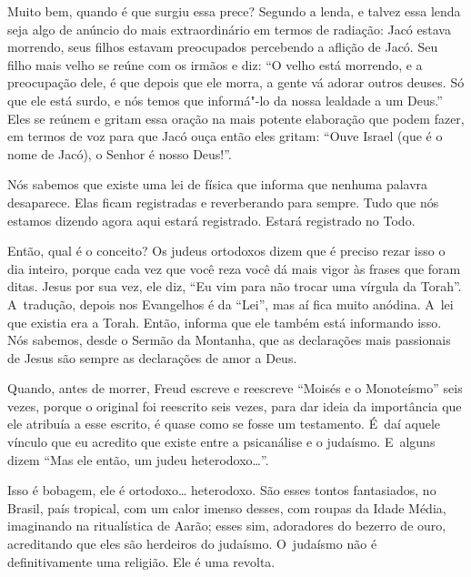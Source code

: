  

Muito bem, quando é que surgiu essa prece? Segundo a lenda, e talvez
essa lenda seja algo de anúncio do mais extraordinário em termos de
radiação: Jacó estava morrendo, seus filhos estavam preocupados
percebendo a aflição de Jacó. Seu filho mais velho se reúne com os
irmãos e diz: ``O velho está morrendo, e a preocupação dele, é que
depois que ele morra, a gente vá adorar outros deuses. Só que ele está
surdo, e nós temos que informá"-lo da nossa lealdade a um Deus.'' Eles se
reúnem e gritam essa oração na mais potente elaboração que podem fazer,
em termos de voz para que Jacó ouça então eles gritam: ``Ouve Israel
(que é o nome de Jacó), o Senhor é nosso Deus!''.

 

Nós sabemos que existe uma lei de física que informa que nenhuma palavra
desaparece. Elas ficam registradas e reverberando para sempre. Tudo que
nós estamos dizendo agora aqui estará registrado. Estará registrado no
Todo.

 

Então, qual é o conceito? Os judeus ortodoxos dizem que é preciso rezar
isso o dia inteiro, porque cada vez que você reza você dá mais vigor às
frases que foram ditas. Jesus por sua vez, ele diz, ``Eu vim para não
trocar uma vírgula da Torah''. A~tradução, depois nos Evangelhos é da
``Lei'', mas aí fica muito anódina. A~lei que existia era a Torah. Então,
informa que ele também está informando isso. Nós sabemos, desde o Sermão
da Montanha, que as declarações mais passionais de Jesus são sempre as
declarações de amor a Deus.

 

Quando, antes de morrer, Freud escreve e reescreve ``Moisés e o
Monoteísmo'' seis vezes, porque o original foi reescrito seis vezes,
para dar ideia da importância que ele atribuía a esse escrito, é quase
como se fosse um testamento. É~daí aquele vínculo que eu acredito que
existe entre a psicanálise e o judaísmo. E~alguns dizem ``Mas ele então,
um judeu heterodoxo…''.

 

Isso é bobagem, ele é ortodoxo… heterodoxo. São esses tontos
fantasiados, no Brasil, país tropical, com um calor imenso desses, com
roupas da Idade Média, imaginando na ritualística de Aarão; esses sim,
adoradores do bezerro de ouro, acreditando que eles são herdeiros do
judaísmo. O~judaísmo não é definitivamente uma religião. Ele é uma
revolta.

 


